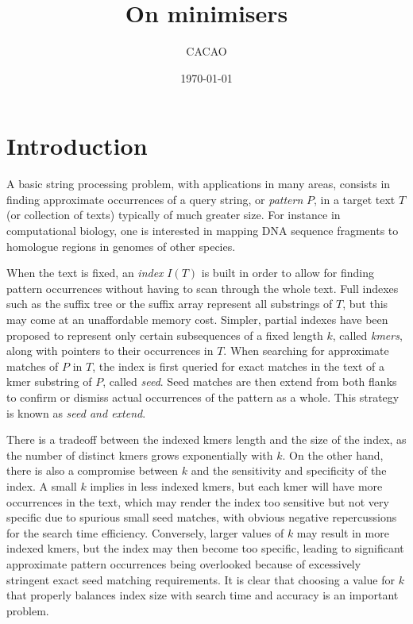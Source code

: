 \documentclass[a4paper, 12pt, oneside]{article}
\author{CACAO}
\date{\today}
\title{On minimisers}
\begin{document}
 

\maketitle

\section{Introduction}

A basic string processing problem, with applications in many areas, consists in finding approximate occurrences of a query string, or \emph{pattern} $P$, in a target text $T$ (or collection of texts) typically of much greater size. For instance in computational biology, one is interested in mapping DNA sequence fragments to homologue regions in genomes  of other species. 

When the text is fixed, an \emph{index} $I(T)$ is built in order to allow for finding pattern occurrences without having to scan through the whole text. Full indexes such as the suffix tree or the suffix array represent all substrings of $T$, but this may come at an unaffordable memory cost. Simpler, partial indexes have been proposed to represent only certain subsequences of a fixed length $k$, called \emph{kmers}, along with pointers to their occurrences in $T$. When searching for approximate matches of $P$ in $T$, the index is first queried for exact matches in the text of a kmer substring of $P$, called \emph{seed}. Seed matches are then extend from both flanks to confirm or dismiss actual occurrences of the pattern as a whole. This strategy is known as \emph{seed and extend}.

There is a tradeoff between the indexed kmers length and the size of the index, as the number of distinct kmers grows exponentially with $k$. On the other hand, there is also a compromise between $k$ and the sensitivity and specificity of the index. A small $k$ implies in less indexed kmers, but each kmer will have more occurrences in the text, which may render the index too sensitive but not very specific due to spurious small seed matches, with obvious negative repercussions for the search time efficiency. Conversely, larger values of $k$ may result in more indexed kmers, but the index may then become too specific, leading to significant approximate pattern occurrences being overlooked because of excessively stringent exact seed matching requirements. It is clear that choosing a value for $k$ that properly balances index size with search time and accuracy is an important problem.   
\end{document}
